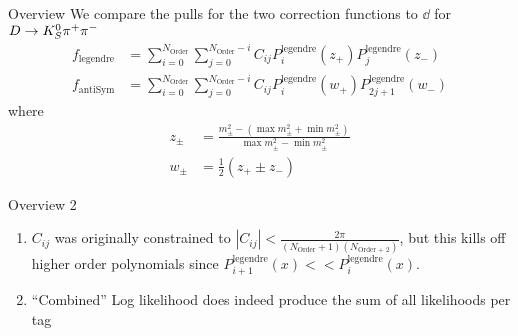 \begin{frame}{Overview}
We compare the pulls for the two correction functions to $\dd$ for $D \to K_S^0 \pi^+ \pi^-$
\begin{equation*}
\begin{split}
    f_\text{legendre} &= \sum_{i=0}^{N_\text{Order}}\sum_{j=0}^{N_\text{Order} - i} C_{ij}P^\text{legendre}_{i}(z_+)P^\text{legendre}_{j}(z_-) \\ 
    f_\text{antiSym} &= \sum_{i=0}^{N_\text{Order}}\sum_{j=0}^{N_\text{Order} - i} C_{ij}P^\text{legendre}_{i}(w_+)P^\text{legendre}_{2j+1}(w_-) 
\end{split}
   
\end{equation*}
where 
\begin{equation*}
    \begin{split}
       z_\pm &= \frac{m_\pm^2 - (\max m_\pm^2 + \min m_\pm^2)}{\max m_\pm^2 - \min m_\pm^2} \\
       w_\pm &= \frac{1}{2} \left(z_+ \pm z_- \right)
    \end{split}
\end{equation*}
\end{frame}

\begin{frame}{Overview 2}
\begin{enumerate}
    \item $C_{ij}$ was originally constrained to $|C_{ij}| < \frac{2 \pi}{(N_\text{Order} + 1)(N_\text{Order + 2})}$, but this kills off higher order polynomials since $P^\text{legendre}_{i+1}(x) << P^\text{legendre}_i(x)$.
    \item ``Combined'' Log likelihood does indeed produce the sum of all likelihoods per tag
    \end{enumerate}
\end{frame}

